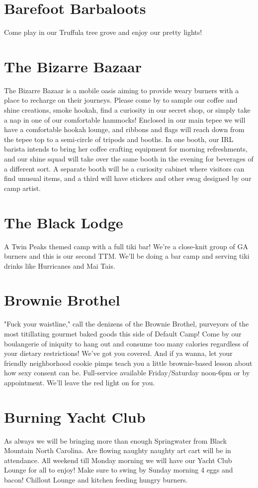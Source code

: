 \begin{multicols}{2}
\section*{Barefoot Barbaloots}
Come play in our Truffula tree grove and enjoy our pretty lights! 


\section*{The Bizarre Bazaar}
The Bizarre Bazaar is a mobile oasis aiming to provide weary burners with a place to recharge on their journeys. Please come by to sample our coffee and shine creations, smoke hookah, find a curiosity in our secret shop, or simply take a nap in one of our comfortable hammocks! Enclosed in our main tepee we will have a comfortable hookah lounge, and ribbons and flags will reach down from the tepee top to a semi-circle of tripods and booths. In one booth, our IRL barista intends to bring her coffee crafting equipment for morning refreshments, and our shine squad will take over the same booth in the evening for beverages of a different sort. A separate booth will be a curiosity cabinet where visitors can find unusual items, and a third will have stickers and other swag designed by our camp artist. 


\section*{The Black Lodge}
A Twin Peaks themed camp with a full tiki bar! We're a close-knit group of GA burners and this is our second TTM. We'll be doing a bar camp and serving tiki drinks like Hurricanes and Mai Tais.




\section*{Brownie Brothel}
"Fuck your waistline," call the denizens of the Brownie Brothel, purveyors of the most titillating gourmet baked goods this side of Default Camp! Come by our boulangerie of iniquity to hang out and consume too many calories regardless of your dietary restrictions! We've got you covered. And if ya wanna, let your friendly neighborhood cookie pimps teach you a little brownie-based lesson about how sexy consent can be. Full-service available Friday/Saturday noon-6pm or by appointment. We'll leave the red light on for you.


\section*{Burning Yacht Club}
As always we will be bringing more than enough Springwater from Black Mountain North Carolina. Are flowing naughty naughty art cart will be in attendance. All weekend till Monday morning we will have our Yacht Club Lounge for all to enjoy! Make sure to swing by Sunday morning 4 eggs and bacon! Chillout Lounge and kitchen feeding hungry burners. 



\end{multicols}
